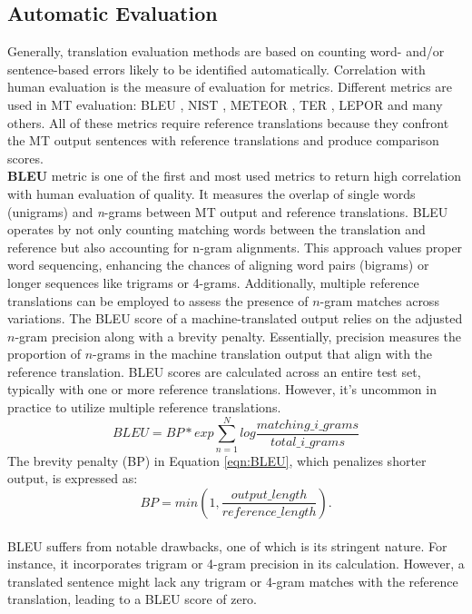 \subsection{Automatic Evaluation} 
Generally, translation evaluation methods are based on counting word- and/or sentence-based errors likely to be identified automatically.
Correlation with human evaluation is the measure of evaluation for metrics.
Different metrics are used in MT evaluation: BLEU \cite{papineni02}, NIST \cite{doddington02}, METEOR \cite{banerjee05}, TER \cite{snover06}, LEPOR \cite{han12} and many others. 
All of these metrics require reference translations because they confront the MT output sentences with reference translations and produce comparison scores.\\
\textbf{BLEU} metric is one of the first and most used metrics to return high correlation with human evaluation of quality. 
It measures the overlap of single words (unigrams) and \textit{n}-grams between MT output and reference translations. 
BLEU operates by not only counting matching words between the translation and reference but also accounting for n-gram alignments. 
This approach values proper word sequencing, enhancing the chances of aligning word pairs (bigrams) or longer sequences like trigrams or 4-grams. 
Additionally, multiple reference translations can be employed to assess the presence of $n$-gram matches across variations.
The BLEU score of a machine-translated output relies on the adjusted $n$-gram precision along with a brevity penalty. 
Essentially, precision measures the proportion of $n$-grams in the machine translation output that align with the reference translation.
BLEU scores are calculated across an entire test set, typically with one or more reference translations. 
However, it's uncommon in practice to utilize multiple reference translations.
\begin{equation}
	BLEU = BP * exp \sum_{n=1}^N log \frac{matching\_i\_grams}{total\_i\_grams}
	\label{eqn:BLEU}
\end{equation}
The brevity penalty (BP) in Equation \ref{eqn:BLEU}, which penalizes shorter output, is expressed as:
\begin{equation*}
	BP = min(1,\frac{output\_length}{reference\_length}).
\end{equation*}
\\BLEU suffers from notable drawbacks, one of which is its stringent nature. 
For instance, it incorporates trigram or 4-gram precision in its calculation. 
However, a translated sentence might lack any trigram or 4-gram matches with the reference translation, leading to a BLEU score of zero.
